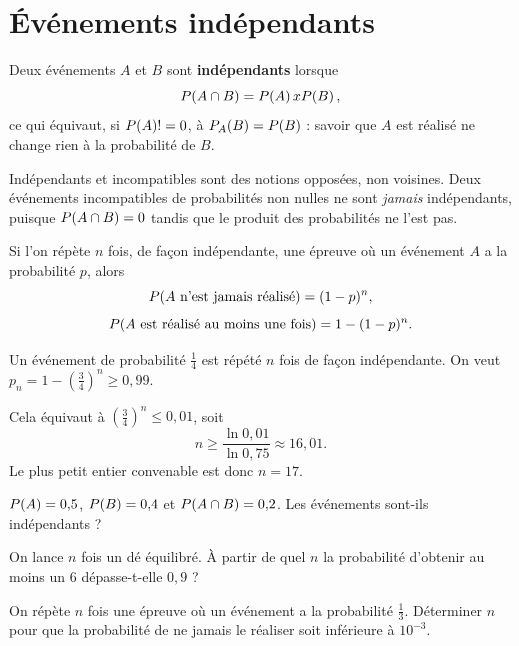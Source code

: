 \section{Événements indépendants}

\begin{definition}[indépendance]
Deux événements $A$ et $B$ sont \textbf{indépendants} lorsque
\[
  \proba{A \cap B} = \proba{A} \times \proba{B},
\]
ce qui équivaut, si $\proba{A} \neq 0$, à
$\probacond{B}{A} = \proba{B}$ : savoir que $A$ est réalisé ne change rien à
la probabilité de $B$.
\end{definition}

\begin{avertissement}
Indépendants et incompatibles sont des notions opposées, non voisines. Deux
événements incompatibles de probabilités non nulles ne sont \emph{jamais}
indépendants, puisque $\proba{A \cap B} = 0$ tandis que le produit des
probabilités ne l'est pas.
\end{avertissement}

\begin{propriete}
Si l'on répète $n$ fois, de façon indépendante, une épreuve où un événement
$A$ a la probabilité $p$, alors
\[
  \proba{\text{$A$ n'est jamais réalisé}} = (1-p)^{n},
\]
\[
  \proba{\text{$A$ est réalisé au moins une fois}} = 1-(1-p)^{n}.
\]
\end{propriete}

\begin{exemple}
Un événement de probabilité $\frac14$ est répété $n$ fois de façon
indépendante. On veut $p_{n} = 1-\left(\frac34\right)^{n} \geq 0{,}99$.

Cela équivaut à $\left(\frac34\right)^{n} \leq 0{,}01$, soit
\[
  n \geq \frac{\ln 0{,}01}{\ln 0{,}75} \approx 16{,}01 .
\]
Le plus petit entier convenable est donc $n = 17$.
\end{exemple}

\begin{entrainement}[indépendance]
\exo[\niveau{1}] $\proba{A} = 0{,}5$, $\proba{B} = 0{,}4$ et
$\proba{A \cap B} = 0{,}2$. Les événements sont-ils indépendants ?

\exo[\niveau{2}] On lance $n$ fois un dé équilibré. À partir de quel $n$ la
probabilité d'obtenir au moins un $6$ dépasse-t-elle $0{,}9$ ?

\exo[\niveau{3}] On répète $n$ fois une épreuve où un événement a la
probabilité $\frac13$. Déterminer $n$ pour que la probabilité de ne jamais le
réaliser soit inférieure à $10^{-3}$.
\end{entrainement}

